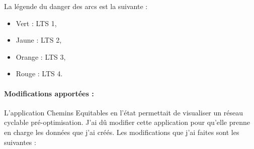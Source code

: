 La légende du danger des arcs est la suivante :
\begin{itemize}
    \item Vert : LTS 1,
    \item Jaune : LTS 2,
    \item Orange : LTS 3,
    \item Rouge : LTS 4.
\end{itemize}

\paragraph{Modifications apportées :}\label{sect:modifs_chemins_eq}

L'application Chemins Equitables en l'état permettait de visualiser un réseau cyclable pré-optimisation. J'ai dû modifier cette application pour qu'elle prenne en charge les données que j'ai créés. Les modifications que j'ai faites sont les suivantes :

